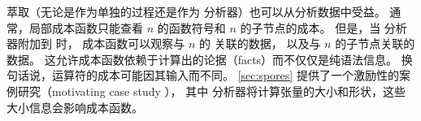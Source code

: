 萃取（无论是作为单独的过程还是作为 \eclass 分析器）也可以从分析数据中受益。
通常，局部成本函数只能查看 \enode $n$ 的函数符号和 $n$ 的子节点的成本。
但是，当 \eclass 分析器附加到 \egraph 时，
  成本函数可以观察与 $n$ 的 \eclass 关联的数据，
  以及与 $n$ 的子节点关联的数据。
这允许成本函数依赖于计算出的论据（facts）而不仅仅是纯语法信息。
换句话说，运算符的成本可能因其输入而不同。
\autoref{sec:spores} 提供了一个激励性的案例研究（motivating case study ），%
  其中 \eclass 分析器将计算张量的大小和形状，这些大小信息会影响成本函数。

